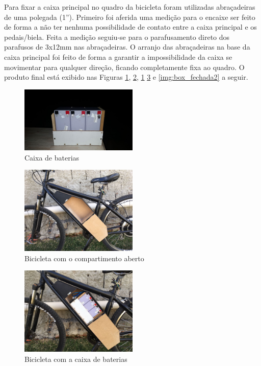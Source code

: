 	Para fixar a caixa principal no quadro da bicicleta foram utilizadas abraçadeiras de uma polegada (1”). Primeiro foi aferida uma medição para o encaixe ser feito de forma a não ter nenhuma possibilidade de contato entre a caixa principal e os pedais/biela. Feita a medição seguiu-se para o parafusamento direto dos parafusos de 3x12mm nas abraçadeiras. O arranjo das abraçadeiras na base da caixa principal foi feito de forma a garantir a impossibilidade da caixa se movimentar para qualquer direção, ficando completamente fixa ao quadro. 
	O produto final está exibido nas Figuras \ref{img:box_baterias}, \ref{img:box_vazia}, \ref{img:box_baterias} \ref{img:box_cheia} e \ref{img:box_fechada2} a seguir.
	\graphicspath{{figuras/}}	
	\begin{figure}[h!]
		\centering
		\includegraphics[width=0.5\textwidth]{baterias.jpg}
			\caption{Caixa de baterias}
		\label{img:box_baterias}
	\end{figure}
	\graphicspath{{figuras/}}	
	\begin{figure}[h!]
		\centering
		\includegraphics[width=0.5\textwidth]{box_vazia.jpg}
		\caption{Bicicleta com o compartimento aberto}
		\label{img:box_vazia}
	\end{figure}
	
	\graphicspath{{figuras/}}	
	\begin{figure}[h!]
		\centering
		\includegraphics[width=0.5\textwidth]{box_cheia.jpg}
		\caption{Bicicleta com a caixa de baterias}
		\label{img:box_cheia}
	\end{figure}
	

